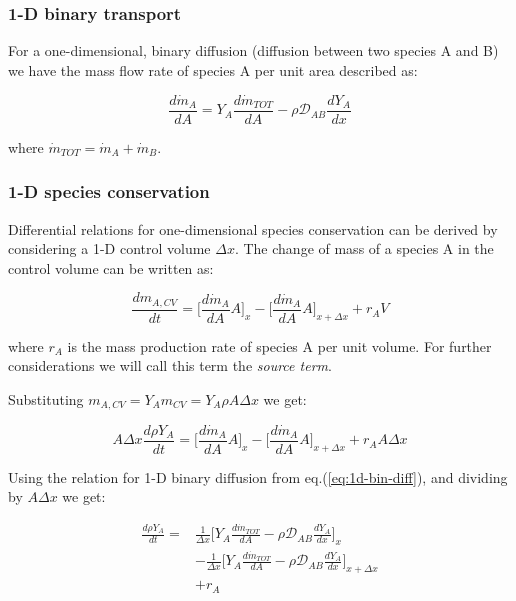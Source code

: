 \documentclass[10pt,twocolumn]{article}
\begin{document}
\subsubsection{1-D binary transport}

For a one-dimensional, binary diffusion (diffusion between two species A and B) we have the mass flow rate of species A per unit area described as:

\begin{equation}
\frac{d \dot{m}_A }{dA} = Y_A \frac{d \dot{m}_{TOT}}{d A} - \rho \mathcal{D}_{AB} \frac{dY_A}{dx}
\end{equation}\label{eq:1d-bin-diff}

where $\dot{m}_{TOT} = \dot{m}_A + \dot{m}_B$.

\subsubsection{1-D species conservation}

Differential relations for one-dimensional species conservation can be derived by considering a 1-D control volume $\Delta x$. The change of mass of a species A in the control volume can be written as:

\begin{equation}
\frac{d m_{A, CV} }{dt} = \Big[ \frac{d \dot{m}_A}{d A} A \Big]_x - \Big[ \frac{d \dot{m}_A}{d A} A \Big]_{x + \Delta x} + r_A V
\end{equation}

where $r_A$ is the mass production rate of species A per unit volume. For further considerations we will call this term the \textit{source term}.

Substituting $m_{A, CV} = Y_A m_{CV} = Y_A \rho A \Delta x$ we get:

\begin{equation}
A \Delta x \frac{d \rho Y_{A} }{dt} = \Big[ \frac{d \dot{m}_A}{d A} A \Big]_x - \Big[ \frac{d \dot{m}_A}{d A} A \Big]_{x + \Delta x} + r_A A \Delta x
\end{equation}

Using the relation for 1-D binary diffusion from eq.(\ref{eq:1d-bin-diff}), and dividing by $A \Delta x$ we get:

\begin{equation}
\begin{aligned}
\frac{d \rho Y_{A} }{dt} = & \frac{1}{\Delta x}\Big[ Y_A \frac{d \dot{m}_{TOT}}{d A} - \rho \mathcal{D}_{AB} \frac{dY_A}{dx} \Big]_x \\
& - \frac{1}{\Delta x} \Big[ Y_A \frac{d \dot{m}_{TOT}}{d A} - \rho \mathcal{D}_{AB} \frac{dY_A}{dx} \Big]_{x + \Delta x} \\
& + r_A
\end{aligned}
\end{equation}
\end{document}
